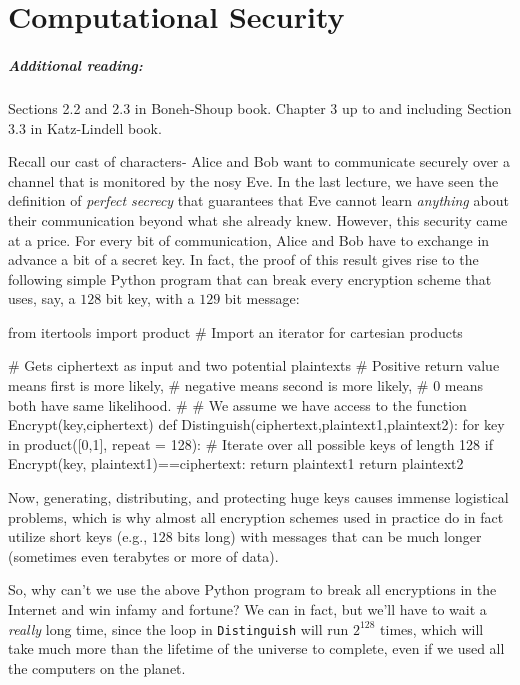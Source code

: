 \chapter{Computational Security}\label{2-Computational-Security}

\paragraph{Additional reading:} Sections 2.2 and 2.3 in Boneh-Shoup
book. Chapter 3 up to and including Section 3.3 in Katz-Lindell book.

Recall our cast of characters- Alice and Bob want to communicate
securely over a channel that is monitored by the nosy Eve. In the last
lecture, we have seen the definition of \emph{perfect secrecy} that
guarantees that Eve cannot learn \emph{anything} about their
communication beyond what she already knew. However, this security came
at a price. For every bit of communication, Alice and Bob have to
exchange in advance a bit of a secret key. In fact, the proof of this
result gives rise to the following simple Python program that can break
every encryption scheme that uses, say, a \(128\) bit key, with a
\(129\) bit message:

\begin{code}
from itertools import product # Import an iterator for cartesian products

# Gets ciphertext as input and two potential plaintexts
# Positive return value means first is more likely,
# negative means second is more likely,
# 0 means both have same likelihood.
#
# We assume we have access to the function Encrypt(key,ciphertext)
def Distinguish(ciphertext,plaintext1,plaintext2):
    for key in product([0,1], repeat = 128): # Iterate over all possible keys of length 128
        if Encrypt(key, plaintext1)==ciphertext:
            return plaintext1
    return plaintext2
\end{code}

Now, generating, distributing, and protecting huge keys causes immense
logistical problems, which is why almost all encryption schemes used in
practice do in fact utilize short keys (e.g., \(128\) bits long) with
messages that can be much longer (sometimes even terabytes or more of
data).

So, why can't we use the above Python program to break all encryptions
in the Internet and win infamy and fortune? We can in fact, but we'll
have to wait a \emph{really} long time, since the loop in
\texttt{Distinguish} will run \(2^{128}\) times, which will take much
more than the lifetime of the universe to complete, even if we used all
the computers on the planet.

